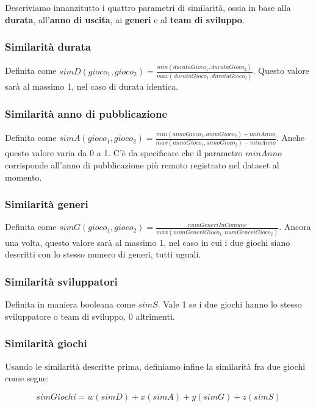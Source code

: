         Descriviamo innanzitutto i quattro parametri di similarità, ossia in base alla \textbf{durata}, all'\textbf{anno di uscita}, ai \textbf{generi} e al \textbf{team di sviluppo}.
        
        \subsubsection{Similarità durata}
            Definita come $simD(gioco_1, gioco_2) = \frac{min(durataGioco_1, durataGioco_2)}{max(durataGioco_1, durataGioco_2)}$. Questo valore sarà al massimo 1, nel caso di durata identica.
            
        \subsubsection{Similarità anno di pubblicazione}
            Definita come $simA(gioco_1, gioco_2) = \frac{min(annoGioco_1, annoGioco_2) - minAnno}{max(annoGioco_1, annoGioco_2) - minAnno}$. Anche questo valore varia da 0 a 1. C'è da specificare che il parametro $minAnno$ corrisponde all'anno di pubblicazione più remoto registrato nel dataset al momento.
            
        \subsubsection{Similarità generi}
            Definita come $simG(gioco_1, gioco_2) = \frac{numGeneriInComune}{max(numGeneriGioco_1, numGeneriGioco_2)}$. Ancora una volta, questo valore sarà al massimo 1, nel caso in cui i due giochi siano descritti con lo stesso numero di generi, tutti uguali.
            
        \subsubsection{Similarità sviluppatori}
            Definita in maniera booleana come $simS$. Vale 1 se i due giochi hanno lo stesso sviluppatore o team di sviluppo, 0 altrimenti.
        
        \subsubsection{Similarità giochi}
            Usando le similarità descritte prima, definiamo infine la similarità fra due giochi come segue:
            \begin{center}
                \begin{equation*}
                    simGiochi = w(simD) + x(simA) + y(simG) + z(simS)
                \end{equation*}
            \end{center}
            
